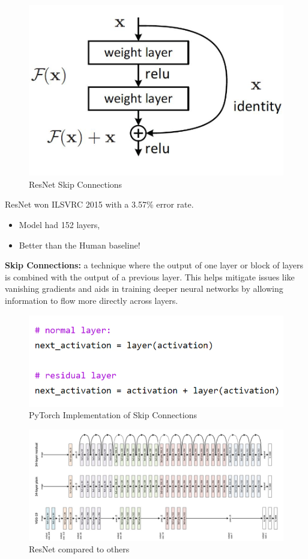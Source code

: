 \begin{figure}[h!t]
    \centering
    \includegraphics[width=0.35\linewidth]{resnet.png}
    \caption{ResNet Skip Connections}
    \label{fig:enter-label}
\end{figure}

ResNet won ILSVRC 2015 with a 3.57\% error rate.
\begin{itemize}
    \item Model had 152 layers,
    \item Better than the Human baseline!
\end{itemize}

\begin{definition}
    \textbf{Skip Connections:} a technique where the output of one layer or block of layers is combined with the output of a previous layer. This helps mitigate issues like vanishing gradients and aids in training deeper neural networks by allowing information to flow more directly across layers.
\end{definition}

\begin{figure}
    \centering
    \includegraphics[width=0.5\linewidth]{resnetpy.png}
    \caption{PyTorch Implementation of Skip Connections}
    \label{fig:enter-label}
\end{figure}

\begin{figure}[h!t]
    \centering
    \includegraphics[width=1\linewidth]{resnetandothers.png}
    \caption{ResNet compared to others}
    \label{fig:enter-label}
\end{figure}

